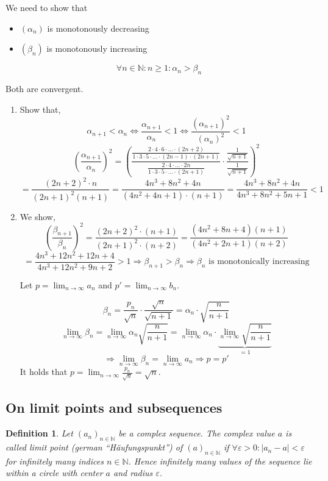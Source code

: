 \documentclass[a4paper,landscape,twocolumn]{article}
\newtheorem{defi}{Definition}
\newcommand\abs[1]{\left|#1\right|}
\newcommand\seq[1]{{\left(#1\right)}_{n \in \mathbb N}}
\begin{document}
We need to show that
\begin{itemize}
  \item $(\alpha_n)$ is monotonously decreasing
  \item $(\beta_n)$ is monotonously increasing
\end{itemize}
\[ \forall n \in \mathbb N: n \geq 1: \alpha_n > \beta_n \]

Both are convergent.

\begin{enumerate}
  \item Show that,
    \[
        \alpha_{n+1} < \alpha_n \Leftrightarrow
        \frac{\alpha_{n+1}}{\alpha_n} < 1 \Leftrightarrow
        \frac{(\alpha_{n+1})^2}{(\alpha_n)^2} < 1
    \] \[
        \left(\frac{\alpha_{n+1}}{\alpha_n}\right)^2 = \left(
            \frac{\frac{2 \cdot 4 \cdot 6 \cdot \ldots \cdot (2n+2)}{1 \cdot 3 \cdot 5 \cdot \ldots \cdot (2n-1) \cdot (2n+1)}}%
            {\frac{2\cdot4\cdot \ldots \cdot 2n}{1 \cdot 3 \cdot 5 \cdot \ldots \cdot (2n+1)}}
            \cdot \frac{\frac{1}{\sqrt{n+1}}}{\frac{1}{\sqrt{n+1}}}
        \right)^2
    \] \[
        = \frac{(2n+2)^2 \cdot n}{(2n+1)^2 (n + 1)}
        = \frac{4n^3+8n^2+4n}{(4n^2 + 4n + 1)\cdot(n+1)}
        = \frac{4n^3+8n^2+4n}{4n^3+8n^2+5n+1}
        < 1
    \]
  \item We show,
    \[
        \left(\frac{\beta_{n+1}}{\beta_n}\right)^2
        = \frac{(2n+2)^2 \cdot (n+1)}{(2n+1)^2 \cdot (n+2)}
        = \frac{(4n^2 + 8n + 4) (n+1)}{(4n^2+2n+1) (n+2)}
    \] \[
        = \frac{4n^3+12n^2+12n+4}{4n^3 + 12n^2 + 9n + 2}
        > 1 \Rightarrow \beta_{n+1} > \beta_n \Rightarrow \beta_n \text{ is monotonically increasing}
    \]

    Let $p = \lim_{n\to\infty} a_n$ and $p' = \lim_{n\to\infty} b_n$.

    \[ \beta_n = \frac{p_n}{\sqrt{n}} \cdot \frac{\sqrt{n}}{\sqrt{n+1}} = \alpha_n \cdot \sqrt{\frac{n}{n+1}} \]
    \[ \lim_{n\to\infty} \beta_n = \lim_{n\to\infty} \alpha_n \sqrt{\frac{n}{n+1}} = \lim_{n\to\infty} \alpha_n \cdot \underbrace{\lim_{n\to\infty} \sqrt{\frac{n}{n+1}}}_{=1} \]
    \[ \Rightarrow \lim_{n\to\infty} \beta_n = \lim_{n\to\infty} a_n \Rightarrow p = p' \]
    It holds that $p = \lim_{n\to\infty} \frac{p_n}{\sqrt{n}} = \sqrt{n}$.
\end{enumerate}

\subsection{On limit points and subsequences}
%
\begin{defi}
  Let $\seq{a_n}$ be a complex sequence.
  The complex value $a$ is called \emph{limit point} (german \enquote{\foreignlanguage{ngerman}{Häufungspunkt}})
  of $\seq{a}$ if $\forall \varepsilon > 0: \abs{a_n - a} < \varepsilon$ for infinitely many indices $n \in \mathbb N$.
  Hence infinitely many values of the sequence lie within a circle with center $a$ and radius $\varepsilon$.
\end{defi}
\end{document}
